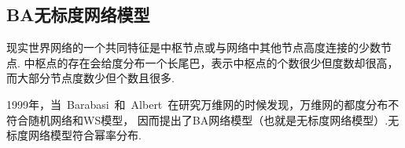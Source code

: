 \documentclass[bachelor,adobefonts]{jnuthesis}
\begin{document}






\subsection{BA无标度网络模型}
现实世界网络的一个共同特征是中枢节点或与网络中其他节点高度连接的少数节点.
中枢点的存在会给度分布一个长尾巴，表示中枢点的个数很少但度数却很高，而大部分节点度数少但个数且很多.

1999年，当\ Barabasi\ 和\ Albert\ 在研究万维网的时候发现，万维网的都度分布不符合随机网络和WS模型，
因而提出了BA网络模型\cite{Albert2002Statistical}（也就是无标度网络模型）.无标度网络模型符合幂率分布.





\end{document}

